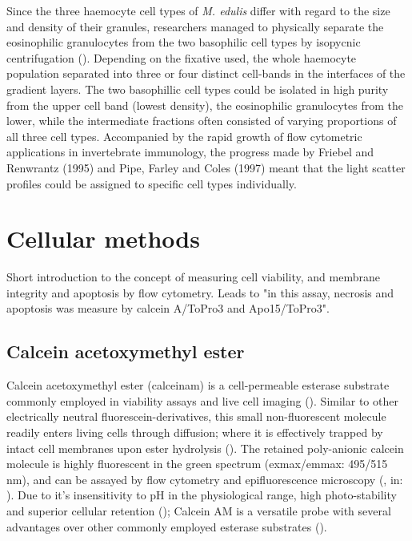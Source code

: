 Since the three haemocyte cell types of \emph{M. edulis} differ with regard to the size and density of their granules, researchers managed to physically separate the eosinophilic granulocytes from the two basophilic cell types by isopycnic centrifugation (\cite{Friebel1995, Pipe1997}). Depending on the fixative used, the whole haemocyte population separated into three or four distinct cell-bands in the interfaces of the gradient layers. The two basophillic cell types could be isolated in high purity from the upper cell band (lowest density), the eosinophilic granulocytes from the lower, while the intermediate fractions often consisted of varying proportions of all three cell types. Accompanied by the rapid growth of flow cytometric applications in invertebrate immunology, the progress made by Friebel and Renwrantz (1995) and Pipe, Farley and Coles (1997) meant that the light scatter profiles could be assigned to specific cell types individually.


\section{Cellular methods}
Short introduction to the concept of measuring cell viability, and membrane integrity and apoptosis by flow cytometry. Leads to "in this assay, necrosis and apoptosis was measure by calcein A/ToPro3 and Apo15/ToPro3".

\subsection{Calcein acetoxymethyl ester}
Calcein acetoxymethyl ester (\acrshort{calceinam}) is a cell-permeable esterase substrate commonly employed in viability assays and live cell imaging (\cite{Ramirez2010}). Similar to other electrically neutral fluorescein-derivatives, this small non-fluorescent molecule readily enters living cells through diffusion; where it is effectively trapped by intact cell membranes upon ester hydrolysis (\cite{Kaneshiro1993}). The retained poly-anionic calcein molecule is highly fluorescent in the green spectrum (\acrshort{exmax}/\acrshort{emmax}: 495/515 nm), and can be assayed by flow cytometry and epifluorescence microscopy (\cite{Wallach1959}, in: \cite{Chiu1977}). Due to it's insensitivity to pH in the physiological range, high photo-stability and superior cellular retention (\cite{Chiu1977, Kaneshiro1993}); Calcein AM is a versatile probe with several advantages over other commonly employed esterase substrates (\cite{Ramirez2010}).

